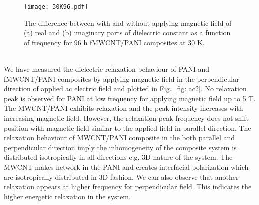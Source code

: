 \documentclass[journal=jaccck,manuscript=article]{achemso}
\begin{document}
\begin{figure}[tbh!] 
	\begin{center}
		\texttt{[image: 30K96.pdf]}
		\small{\caption{ The difference between with and without applying magnetic field of (a) real and (b) imaginary parts of dielectric constant as a function of frequency for 96 h fMWCNT/PANI composites at 30 K.  \label{fig: 96h_30K}}}
	\end{center}
\end{figure}
\\We have measured the dielectric relaxation behaviour of PANI and fMWCNT/PANI composites by applying magnetic field in the perpendicular direction of applied ac electric field and plotted in Fig.~\ref{fig: ac2}. No relaxation peak is observed for PANI at low frequency for applying magnetic field up to 5 T. The MWCNT/PANI exhibits relaxation and the peak intensity increases with increasing magnetic field. However, the relaxation peak frequency does not shift position with magnetic field similar to the applied field in parallel direction. The relaxation behaviour of MWCNT/PANI composite in the both parallel and perpendicular direction imply the inhomogeneity of the composite system is distributed isotropically in all directions e.g. 3D nature of the system. The MWCNT makes network in the PANI and creates interfacial polarization which are isotropically distributed in 3D fashion. We can also observe that another relaxation appears at higher frequency for perpendicular field. This indicates the higher energetic relaxation in the system. 

\end{document}
